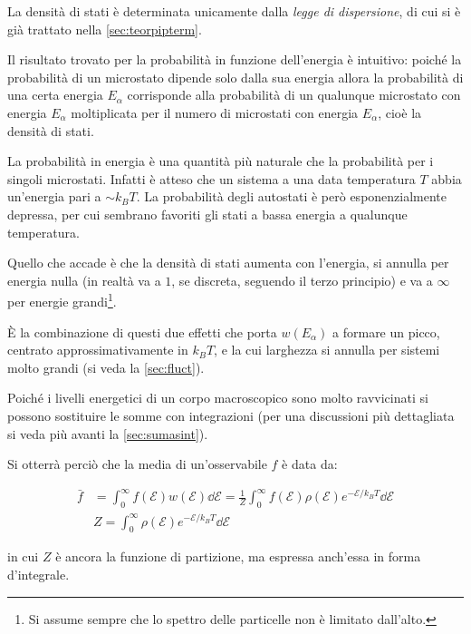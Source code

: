 \noindent La densità di stati è determinata unicamente dalla \textit{legge di dispersione}, di cui si è già trattato nella \cref{sec:teorpipterm}.

Il risultato trovato per la probabilità in funzione dell'energia è intuitivo: poiché la probabilità di un microstato dipende solo dalla sua energia allora la probabilità di una certa energia $E_\alpha$ corrisponde alla probabilità di un qualunque microstato con energia $E_\alpha$ moltiplicata per il numero di microstati con energia $E_\alpha$, cioè la densità di stati.

\begin{oss}
	La probabilità in energia è una quantità più naturale che la probabilità per i singoli microstati. Infatti è atteso che un sistema a una data temperatura $T$ abbia un'energia pari a $\sim k_B T$. La probabilità degli autostati è però esponenzialmente depressa, per cui sembrano favoriti gli stati a bassa energia a qualunque temperatura.
	
	Quello che accade è che la densità di stati aumenta con l'energia, si annulla per energia nulla (in realtà va a $1$, se discreta, seguendo il terzo principio) e va a $\infty$ per energie grandi\footnote{Si assume sempre che lo spettro delle particelle non è limitato dall'alto.}. 
	
	\`E la combinazione di questi due effetti che porta $w(E_\alpha)$ a formare un picco, centrato approssimativamente in $k_B T$, e la cui larghezza si annulla per sistemi molto grandi (si veda la \cref{sec:fluct}).
\end{oss}

Poiché i livelli energetici di un corpo macroscopico sono molto ravvicinati si possono sostituire le somme con integrazioni (per una discussioni più dettagliata si veda più avanti la \cref{sec:sumasint}).

Si otterrà perciò che la media di un'osservabile $f$ è data da:

\begin{align*}
\bar{f} &= \int_{0}^{\infty} f(\mathcal{E}) w(\mathcal{E})\dd \mathcal{E} = \frac{1}{Z} \int_{0}^{\infty} f(\mathcal{E}) \rho(\mathcal{E}) e^{-\mathcal{E}/k_B T}\dd \mathcal{E}\\
& Z = \int_{0}^{\infty} \rho(\mathcal{E}) e^{-\mathcal{E}/k_B T}\dd \mathcal{E}\
\end{align*}

\noindent in cui $Z$ è ancora la funzione di partizione, ma espressa anch'essa in forma d'integrale.

